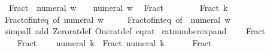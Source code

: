 \begin{isabellebody}
\ \ {\isachardoublequoteopen}Fract\ {\isacharparenleft}{\kern0pt}{\isacharminus}{\kern0pt}\ numeral\ w{\isacharparenright}{\kern0pt}\ {}\ {\isacharequal}{\kern0pt}\ {\isacharminus}{\kern0pt}\ numeral\ w{\isachardoublequoteclose}\isanewline
\ \ {\isachardoublequoteopen}Fract\ {\isacharparenleft}{\kern0pt}{\isacharminus}{\kern0pt}\ {}{\isacharparenright}{\kern0pt}\ {}\ {\isacharequal}{\kern0pt}\ {\isacharminus}{\kern0pt}\ {}{\isachardoublequoteclose}\isanewline
\ \ {\isachardoublequoteopen}Fract\ k\ {}\ {\isacharequal}{\kern0pt}\ {}{\isachardoublequoteclose}\isanewline
%
\isadelimproof
\ \ %
\endisadelimproof
%
\isatagproof
{}\isamarkupfalse%
\ Fract{\isacharunderscore}{\kern0pt}of{\isacharunderscore}{\kern0pt}int{\isacharunderscore}{\kern0pt}eq\ {\isacharbrackleft}{\kern0pt}of\ {\isachardoublequoteopen}numeral\ w{\isachardoublequoteclose}{\isacharbrackright}{\kern0pt}\isanewline
\ \ \ \ \ Fract{\isacharunderscore}{\kern0pt}of{\isacharunderscore}{\kern0pt}int{\isacharunderscore}{\kern0pt}eq\ {\isacharbrackleft}{\kern0pt}of\ {\isachardoublequoteopen}{\isacharminus}{\kern0pt}\ numeral\ w{\isachardoublequoteclose}{\isacharbrackright}{\kern0pt}\isanewline
\ \ \isamarkupfalse%
\ {\isacharparenleft}{\kern0pt}simp{\isacharunderscore}{\kern0pt}all\ add{\isacharcolon}{\kern0pt}\ Zero{\isacharunderscore}{\kern0pt}rat{\isacharunderscore}{\kern0pt}def\ One{\isacharunderscore}{\kern0pt}rat{\isacharunderscore}{\kern0pt}def\ eq{\isacharunderscore}{\kern0pt}rat{\isacharparenright}{\kern0pt}%
\endisatagproof
{\isafoldproof}%
%
\isadelimproof
\isanewline
%
\endisadelimproof
\isanewline
{}\isamarkupfalse%
\ rat{\isacharunderscore}{\kern0pt}number{\isacharunderscore}{\kern0pt}expand{\isacharcolon}{\kern0pt}\isanewline
\ \ {\isachardoublequoteopen}{}\ {\isacharequal}{\kern0pt}\ Fract\ {}\ {}{\isachardoublequoteclose}\isanewline
\ \ {\isachardoublequoteopen}{}\ {\isacharequal}{\kern0pt}\ Fract\ {}\ {}{\isachardoublequoteclose}\isanewline
\ \ {\isachardoublequoteopen}numeral\ k\ {\isacharequal}{\kern0pt}\ Fract\ {\isacharparenleft}{\kern0pt}numeral\ k{\isacharparenright}{\kern0pt}\ {}{\isachardoublequoteclose}\isanewline
\ \ {\isachardoublequoteopen}{\isacharminus}{\kern0pt}\ {}\ {\isacharequal}{\kern0pt}\ Fract\ {\isacharparenleft}{\kern0pt}{\isacharminus}{\kern0pt}\ {}{\isacharparenright}{\kern0pt}\ {}{\isachardoublequoteclose}\isanewline

\end{isabellebody}
